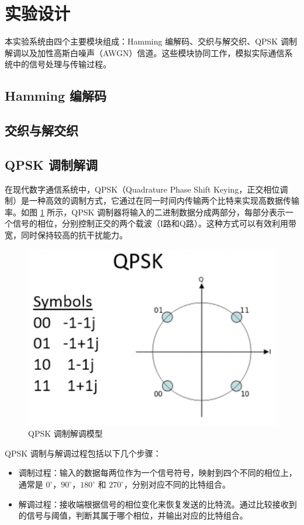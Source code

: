 \section{实验设计}

本实验系统由四个主要模块组成：Hamming 编解码、交织与解交织、QPSK 调制解调以及加性高斯白噪声（AWGN）信道。这些模块协同工作，模拟实际通信系统中的信号处理与传输过程。

\subsection{Hamming 编解码}



\subsection{交织与解交织}



\subsection{QPSK 调制解调}

在现代数字通信系统中，QPSK（Quadrature Phase Shift Keying，正交相位调制）是一种高效的调制方式，它通过在同一时间内传输两个比特来实现高数据传输率。如图 \ref{fig:qpsk_model} 所示，QPSK 调制器将输入的二进制数据分成两部分，每部分表示一个信号的相位，分别控制正交的两个载波（I路和Q路）。这种方式可以有效利用带宽，同时保持较高的抗干扰能力。

\begin{figure}[ht]
    \centering
    \includegraphics[width=.3\textwidth]{static/qpsk_model.png}
    \caption{QPSK 调制解调模型}
    \label{fig:qpsk_model}
\end{figure}

QPSK 调制与解调过程包括以下几个步骤：

\begin{itemize} 
    \item 调制过程：输入的数据每两位作为一个信号符号，映射到四个不同的相位上，通常是 $0^\circ$，$90^\circ$，$180^\circ$ 和 $270^\circ$，分别对应不同的比特组合。
    \item 解调过程：接收端根据信号的相位变化来恢复发送的比特流。通过比较接收到的信号与阈值，判断其属于哪个相位，并输出对应的比特组合。
\end{itemize}





